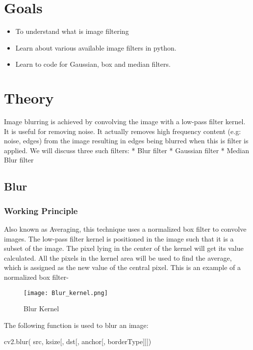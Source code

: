 \documentclass[]{article}
\date{}
\newenvironment{Shaded}{}{}
\newcommand{\NormalTok}[1]{{#1}}
\providecommand{\tightlist}{%
  \setlength{\itemsep}{0pt}\setlength{\parskip}{0pt}}
\begin{document}
\section{Goals}\label{goals}

\begin{itemize}
\tightlist
\item
  To understand what is image filtering
\item
  Learn about various available image filters in python.
\item
  Learn to code for Gaussian, box and median filters.
\end{itemize}

\section{Theory}\label{theory}

Image blurring is achieved by convolving the image with a low-pass
filter kernel. It is useful for removing noise. It actually removes high
frequency content (e.g: noise, edges) from the image resulting in edges
being blurred when this is filter is applied. We will discuss three such
filters: * Blur filter * Gaussian filter * Median Blur filter

\subsection{Blur}\label{blur}

\subsubsection{Working Principle}\label{working-principle}

Also known as Averaging, this technique uses a normalized box filter to
convolve images. The low-pass filter kernel is positioned in the image
such that it is a subset of the image. The pixel lying in the center of
the kernel will get its value calculated. All the pixels in the kernel
area will be used to find the average, which is assigned as the new
value of the central pixel. This is an example of a normalized box
filter-

\begin{figure}[htbp]
\centering
\texttt{[image: Blur\_kernel.png]}
\caption{Blur Kernel}
\end{figure}

The following function is used to blur an image:

\begin{Shaded}
\begin{Highlighting}[]
\NormalTok{cv2.blur( src, ksize[, dst[, anchor[, borderType]]])}
\end{Highlighting}
\end{Shaded}
\end{document}
